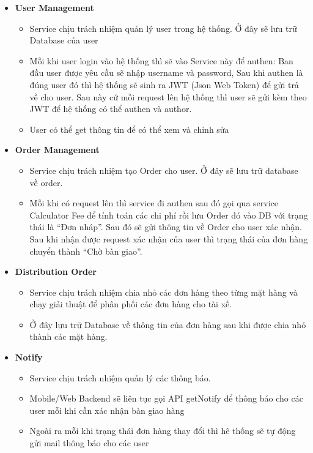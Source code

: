 		\begin{itemize}
			\item \textbf{User Management}
			\begin{itemize}
				\item Service chịu trách nhiệm quản lý user trong hệ thống. Ở đây sẽ lưu trữ Database của user
				\item Mỗi khi user login vào hệ thống thì sẽ vào Service này để authen: Ban đầu user được yêu cầu sẽ nhập username và password, Sau khi authen là đúng user đó thì hệ thống sẽ sinh ra JWT (Json Web Token) để gửi trả về cho user. Sau này cứ mỗi request lên hệ thống thì user sẽ gửi kèm theo JWT để hệ thống có thể authen và author.
				\item User có thể get thông tin để có thể xem và chỉnh sửa
			\end{itemize}
			\item \textbf{Order Management}
			\begin{itemize}
				\item Service chịu trách nhiệm tạo Order cho user. Ở đây sẽ lưu trữ database về order.
				\item Mỗi khi có request lên thì service đi authen sau đó gọi qua service Calculator Fee để tính toán các chi phí rồi lưu Order đó vào DB với trạng thái là “Đơn nháp”. Sau đó sẽ gửi thông tin về Order cho user xác nhận. Sau khi nhận được request xác nhận của user thì trạng thái của đơn hàng chuyển thành “Chờ bàn giao”.
			\end{itemize}
			\item \textbf{Distribution Order}
			\begin{itemize}
				\item Service chịu trách nhiệm chia nhỏ các đơn hàng theo từng mặt hàng và chạy giải thuật để phân phối các đơn hàng cho tài xế.
				\item Ở đây lưu trữ Database về thông tin của đơn hàng sau khi được chia nhỏ thành các mặt hàng.
			\end{itemize}
			\item \textbf{Notify}
			\begin{itemize}
				\item Service chịu trách nhiệm quản lý các thông báo.
				\item Mobile/Web Backend sẽ liên tục gọi API getNotify để thông báo cho các user mỗi khi cần xác nhận bàn giao hàng
				\item Ngoài ra mỗi khi trạng thái đơn hàng thay đổi thì hê thống sẽ tự động gửi mail thông báo cho các user
			\end{itemize}

\end{itemize}

